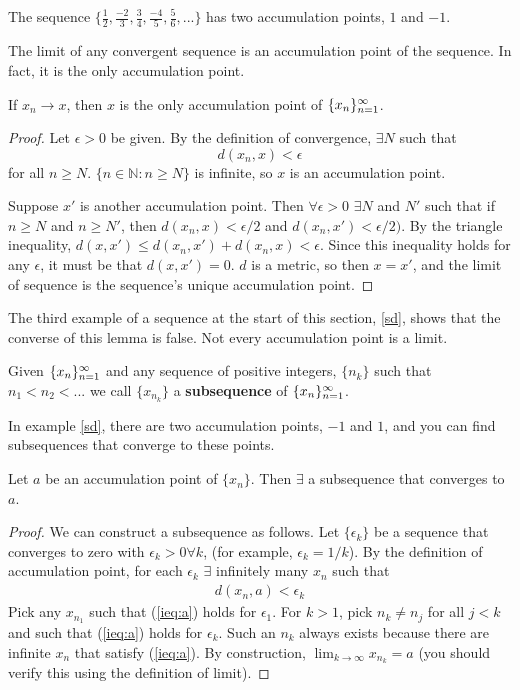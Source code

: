 \begin{example}
  The sequence $\{\frac{1}{2}, \frac{-2}{3}, \frac{3}{4},
  \frac{-4}{5}, \frac{5}{6}, ... \}$ has two accumulation points, $1$ 
  and $-1$.
\end{example}
The limit of any convergent sequence is an accumulation point of the
sequence. In fact, it is the only accumulation point.
\begin{lemma}
  If $x_n \rightarrow x$, then $x$ is the only accumulation point of
  $\{{x}_n \}_{n=1}^\infty$. 
\end{lemma}
\begin{proof}
  Let $\epsilon>0$ be given. By the definition of convergence,
  $\exists N$ such that 
  \[ d(x_n,x) < \epsilon \]
  for all $n \geq N$. $\{n\in \mathbb{N}: n\geq N\}$ is infinite, so
  $x$ is an accumulation point. 

  Suppose $x'$ is another accumulation point. Then $\forall
  \epsilon>0$ $\exists N$ and $N'$ such that if $n \geq N$ and $n \geq
  N'$, then $d(x_n, x) < \epsilon/2$ and $d(x_n,x') < \epsilon/2)$. By
  the triangle inequality, $d(x,x') \leq d(x_n,x') + d(x_n,x) <
  \epsilon$. Since this inequality holds for any $\epsilon$, it must
  be that $d(x,x') = 0$. $d$ is a metric, so then $x = x'$, and the
  limit of sequence is the sequence's unique accumulation point. 
\end{proof}
The third example of a sequence at the start of this section,
\ref{sd}, shows that the converse of this lemma is false. Not every
accumulation point is a limit. 
\begin{definition}
  Given $\{{x}_n \}_{n=1}^\infty$ and any sequence of positive integers, $\{n_k\}$
  such that $n_1 < n_2 < ... $ we call $\{x_{n_k}\}$ a
  \textbf{subsequence} of $\{{x}_n \}_{n=1}^\infty$. 
\end{definition}
In example \ref{sd}, there are two accumulation points, $-1$ and $1$,
and you can find subsequences that converge to these points. 
\begin{lemma}
  Let $a$ be an accumulation point of $\{x_n\}$. Then $\exists$
  a subsequence that converges to $a$. 
\end{lemma}
\begin{proof}
  We can construct a subsequence as follows. Let $\{\epsilon_k\}$ be a
  sequence that converges to zero with $\epsilon_k >0 \forall k$, (for
  example, $\epsilon_k = 1/k$). By the definition of accumulation
  point, for each $\epsilon_k$ $\exists$ infinitely many $x_n$ such
  that 
  \begin{align}
    d(x_n, a) < \epsilon_k \label{ieq:a}
  \end{align}
  Pick any $x_{n_1}$ such that (\ref{ieq:a}) holds for
  $\epsilon_1$. For $k>1$, pick $n_k \neq n_{j}$ for all $j<k$ and
  such that (\ref{ieq:a}) holds for $\epsilon_k$. Such an $n_k$ always
  exists because there are infinite $x_n$ that satisfy
  (\ref{ieq:a}). By construction, $\lim_{k\rightarrow \infty} x_{n_k}
  = a$ (you should verify this using the definition of limit).
\end{proof}

